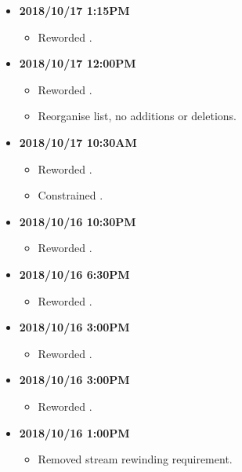 \documentclass[../gazprea.tex]{subfiles}
\begin{document}
\begin{itemize}
\begin{itemize}
\begin{itemize}
      \end{itemize}
    \end{itemize}
  \item
    \textbf{2018/10/17 1:15PM}
    \begin{itemize}
      \item Reworded .
    \end{itemize}
  \item
    \textbf{2018/10/17 12:00PM}
    \begin{itemize}
      \item Reworded .
      \item Reorganise  list, no additions or deletions.
    \end{itemize}
  \item
    \textbf{2018/10/17 10:30AM}
    \begin{itemize}
      \item Reworded .
      \item Constrained  .
    \end{itemize}
  \item
    \textbf{2018/10/16 10:30PM}
    \begin{itemize}
      \item Reworded .
    \end{itemize}
  \item
    \textbf{2018/10/16 6:30PM}
    \begin{itemize}
      \item Reworded .
    \end{itemize}
  \item
    \textbf{2018/10/16 3:00PM}
    \begin{itemize}
      \item Reworded .
    \end{itemize}
  \item
    \textbf{2018/10/16 3:00PM}
    \begin{itemize}
      \item Reworded .
    \end{itemize}
  \item
    \textbf{2018/10/16 1:00PM}
    \begin{itemize}
      \item Removed stream rewinding requirement.
    \end{itemize}

\end{itemize}
\end{document}
